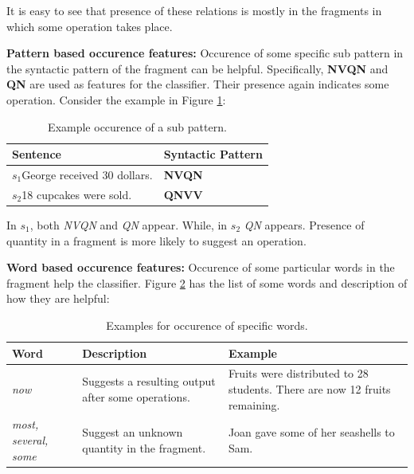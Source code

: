 \documentclass[11pt]{article}
\begin{document}
It is easy to see that presence of these relations is mostly in the fragments in which some operation takes place.

\textbf{Pattern based occurence features:} Occurence of some specific sub pattern in the syntactic pattern of the fragment can be helpful. Specifically, \textbf{NVQN} and \textbf{QN} are used as features for the classifier. Their presence again indicates some operation. Consider the example in Figure \ref{figure:16}:

\begin{table}[h!]
\centering
\begin{tabular}{ | m{20em} | m{5em} |}
\hline
 \textbf{Sentence} & \textbf{Syntactic Pattern}\\
\hline
\begin{math}s_{1}\end{math}George received 30 dollars. & \textbf{NVQN} \\
\hline
\begin{math}s_{2}\end{math}18 cupcakes were sold. & \textbf{QNVV} \\
\hline
\end{tabular}
\caption{Example occurence of a sub pattern.}
\label{figure:16}
\end{table}

In \begin{math}s_{1}\end{math}, both \textit{NVQN} and \textit{QN} appear. While, in \begin{math}s_{2}\end{math} \textit{QN} appears. Presence of quantity in a fragment is more likely to suggest an operation. 

\textbf{Word based occurence features:} Occurence of some particular words in the fragment help the classifier. Figure \ref{figure:17} has the list of some words and description of how they are helpful:

\newpage
\begin{table}[h!]
\centering
\begin{tabular}{ | m{5em} | m{15em} | m{15em} | }
\hline
 \textbf{Word} & \textbf{Description} & \textbf{Example}\\
\hline
\textit{now} & Suggests a resulting output after some operations. & Fruits were distributed to 28 students. There are now 12 fruits remaining. \\
\hline
\textit{most, several, some} & Suggest an unknown quantity in the fragment. & Joan gave some of her seashells to Sam. \\
\hline
\end{tabular}
\caption{Examples for occurence of specific words.}
\label{figure:17}
\end{table}
\end{document}
